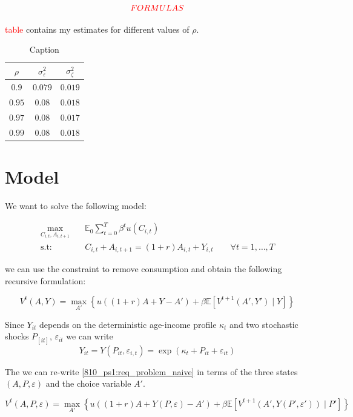 \documentclass[12pt]{article}
\begin{document}
$$\textcolor{red}{FORMULAS}$$

\textcolor{red}{table} contains my estimates for different values of $\rho$.

\begin{table}[h*]
    \centering
    \begin{tabular}{|c|c|c|}
        \hline
        $\rho$ & $\sigma_{\varepsilon}^2$ & $\sigma_{\zeta}^2$\\
        \hline
        $0.9$ & $0.079$ & $0.019$\\
        $0.95$ & $0.08$ & $0.018$\\
        $0.97$ & $0.08$ & $0.017$\\
        $0.99$ & $0.08$ & $0.018$\\
        \hline
    \end{tabular}
    \caption{Caption}
    \label{tab:my_label}
\end{table}


\section{Model}
We want to solve the following model:

\begin{align*}\label{810_ps1:seq_problem}
\max_{C_{i,t}, A_{i,t+1}} \quad &\mathbb{E}_0 \sum_{t = 0}^{T}\beta^{t}u(C_{i,t})\\
\text{s.t:} \quad & C_{i,t} + A_{i,t+1} = (1+r)A_{i,t}+Y_{i,t} \qquad \forall t=1,\ldots,T
\end{align*}

we can use the constraint to remove consumption and obtain the following recursive formulation:

\begin{equation}\label{810_ps1:req_problem_naive}
    V^t(A, Y) = \max_{A'}\left\{u\left( (1+r)A+Y - A'\right) + \beta \mathbb{E}\left[ V^{t+1}(A', Y') \mid Y \right] \right\}
\end{equation}

Since $Y_{it}$ depends on the deterministic age-income profile $\kappa_t$ and two stochastic shocks $P_[it]$, $\varepsilon_{it}$ we can write $$Y_{it} = Y(P_{it}, \varepsilon_{i,t}) = \exp{(\kappa_t + P_{it} + \varepsilon_{it})}$$

The we can re-write \eqref{810_ps1:req_problem_naive} in terms of the three states $(A, P, \varepsilon)$ and the choice variable $A'$.

\begin{equation}\label{810_ps1:req_problem}
     V^t(A, P, \varepsilon) = \max_{A'}\left\{u\left( (1+r)A+ Y(P, \varepsilon) - A'\right) + \beta \mathbb{E}\left[ V^{t+1}(A', Y(P', \varepsilon')) \mid P' \right] \right\}
\end{equation}
\end{document}

